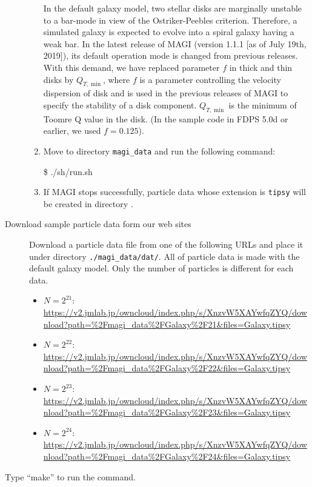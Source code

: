 \begin{description}
\begin{enumerate}
\begin{enumerate}[label=(\roman*)]
\end{enumerate}
In the default galaxy model, two stellar disks are marginally unstable to a bar-mode in view of the Ostriker-Peebles criterion. Therefore, a simulated galaxy is expected to evolve into a spiral galaxy having a weak bar. In the latest release of \textsc{MAGI} (version 1.1.1 [as of July 19th, 2019]), its default operation mode is changed from previous releases. With this demand, we have replaced parameter $f$ in thick and thin disks by $Q_{T,\min}$, where $f$ is a parameter controlling the velocity dispersion of disk and is used in the previous releases of \textsc{MAGI} to specify the stability of a disk component. $Q_{T,\min}$ is the minimum of Toomre Q value in the disk. (In the sample code in FDPS 5.0d or earlier, we used $f=0.125$).
\item Move to directory \texttt{magi\_data} and run the following command:
\begin{screen}
\$ ./sh/run.sh
\end{screen}
\item If \textsc{MAGI} stops successfully, particle data whose extension is \texttt{tipsy} will be created in directory .
\end{enumerate}
\item[Download sample particle data form our web sites]  Download a particle data file from one of the following URLs and place it under directory \texttt{./magi\_data/dat/}. All of particle data is made with the default galaxy model. Only the number of particles is different for each data.
\begin{itemize}
\item $N=2^{21}$: \url{https://v2.jmlab.jp/owncloud/index.php/s/XnzvW5XAYwfqZYQ/download?path=%2Fmagi_data%2FGalaxy%2F21&files=Galaxy.tipsy}
\item $N=2^{22}$: \url{https://v2.jmlab.jp/owncloud/index.php/s/XnzvW5XAYwfqZYQ/download?path=%2Fmagi_data%2FGalaxy%2F22&files=Galaxy.tipsy}
\item $N=2^{23}$: \url{https://v2.jmlab.jp/owncloud/index.php/s/XnzvW5XAYwfqZYQ/download?path=%2Fmagi_data%2FGalaxy%2F23&files=Galaxy.tipsy}
\item $N=2^{24}$: \url{https://v2.jmlab.jp/owncloud/index.php/s/XnzvW5XAYwfqZYQ/download?path=%2Fmagi_data%2FGalaxy%2F24&files=Galaxy.tipsy}
\end{itemize}
\end{description}

\label{s3sec:NbodySPH_make}
Type ``make'' to run the  command.

